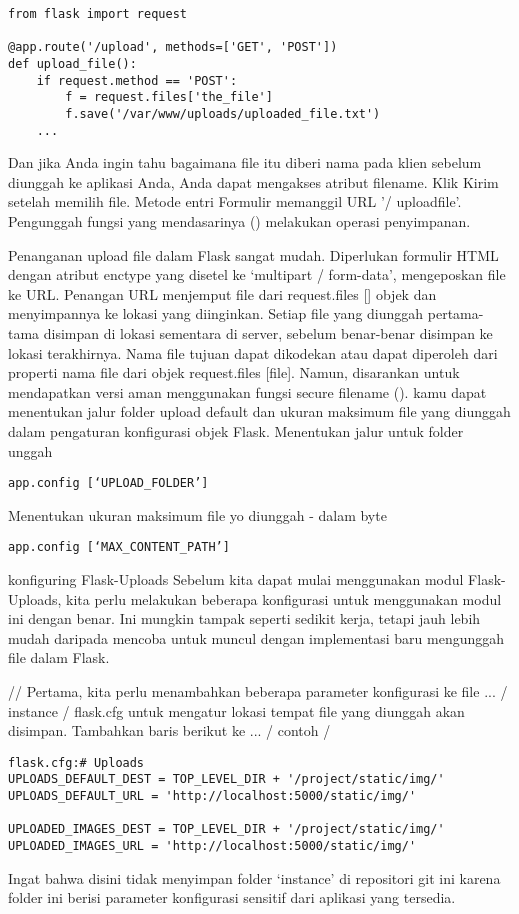 \documentclass[12pt,a4paper]{article}
\begin{document}
\begin{verbatim}
from flask import request

@app.route('/upload', methods=['GET', 'POST'])
def upload_file():
    if request.method == 'POST':
        f = request.files['the_file']
        f.save('/var/www/uploads/uploaded_file.txt')
    ...
\end{verbatim}
Dan jika Anda ingin tahu bagaimana file itu diberi nama pada klien sebelum diunggah ke aplikasi Anda, Anda dapat mengakses atribut filename.
Klik Kirim setelah memilih file. Metode entri Formulir memanggil URL '/ uploadfile'. Pengunggah fungsi yang mendasarinya () melakukan operasi penyimpanan.

Penanganan upload file dalam Flask sangat mudah. Diperlukan formulir HTML dengan atribut enctype yang disetel ke ‘multipart / form-data’, mengeposkan file ke URL. Penangan URL menjemput file dari request.files [] objek dan menyimpannya ke lokasi yang diinginkan.
	Setiap file yang diunggah pertama-tama disimpan di lokasi sementara di server, sebelum benar-benar disimpan ke lokasi terakhirnya. Nama file tujuan dapat dikodekan atau dapat diperoleh dari properti nama file dari objek request.files [file]. Namun, disarankan untuk mendapatkan versi aman menggunakan fungsi secure filename ().
kamu dapat menentukan jalur folder upload default dan ukuran maksimum file yang diunggah dalam pengaturan konfigurasi objek Flask.
Menentukan jalur untuk folder unggah
\begin{verbatim}
app.config [‘UPLOAD_FOLDER’] 
\end{verbatim}
Menentukan ukuran maksimum file yo diunggah - dalam byte
\begin{verbatim}
app.config [‘MAX_CONTENT_PATH’] 
\end{verbatim}



konfiguring Flask-Uploads
Sebelum kita dapat mulai menggunakan modul Flask-Uploads, kita perlu melakukan beberapa konfigurasi untuk menggunakan modul ini dengan benar. Ini mungkin tampak seperti sedikit kerja, tetapi jauh lebih mudah daripada mencoba untuk muncul dengan implementasi baru mengunggah file dalam Flask.

// Pertama, kita perlu menambahkan beberapa parameter konfigurasi ke file ... / instance / flask.cfg untuk mengatur lokasi tempat file yang diunggah akan disimpan. Tambahkan baris berikut ke ... / contoh / 

\begin{verbatim}
flask.cfg:# Uploads
UPLOADS_DEFAULT_DEST = TOP_LEVEL_DIR + '/project/static/img/'
UPLOADS_DEFAULT_URL = 'http://localhost:5000/static/img/'
 
UPLOADED_IMAGES_DEST = TOP_LEVEL_DIR + '/project/static/img/'
UPLOADED_IMAGES_URL = 'http://localhost:5000/static/img/'
\end{verbatim}
Ingat bahwa disini tidak menyimpan folder ‘instance’ di repositori git ini karena folder ini berisi parameter konfigurasi sensitif dari aplikasi yang tersedia.
\end{document}
